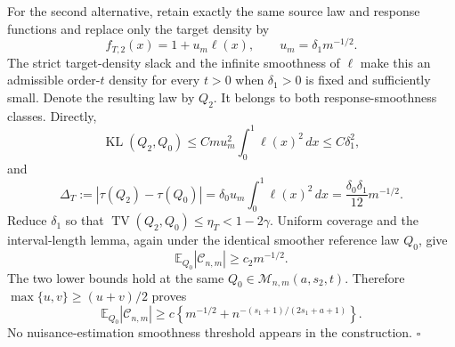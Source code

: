 For the second alternative, retain exactly the same source law and response functions and replace only the target density by
\[
f_{T,2}(x)=1+u_m\ell(x),
\qquad
u_m=\delta_1m^{-1/2}.
\]
The strict target-density slack and the infinite smoothness of \(\ell\) make this an admissible order-\(t\) density for every \(t>0\) when \(\delta_1>0\) is fixed and sufficiently small. Denote the resulting law by \(Q_2\). It belongs to both response-smoothness classes. Directly,
\[
\operatorname{KL}(Q_2,Q_0)
\le Cm u_m^2\int_0^1\ell(x)^2\,dx
\le C\delta_1^2,
\]
and
\[
\Delta_T:=|\tau(Q_2)-\tau(Q_0)|
=\delta_0u_m\int_0^1\ell(x)^2\,dx
=\frac{\delta_0\delta_1}{12}m^{-1/2}.
\]
Reduce \(\delta_1\) so that \(\operatorname{TV}(Q_2,Q_0)\le\eta_T<1-2\gamma\). Uniform coverage and the interval-length lemma, again under the identical smoother reference law \(Q_0\), give
\[
\mathbb E_{Q_0}|\mathcal C_{n,m}|
\ge c_2m^{-1/2}.
\]
The two lower bounds hold at the same \(Q_0\in\mathcal M_{n,m}(a,s_2,t)\). Therefore \(\max\{u,v\}\ge(u+v)/2\) proves
\[
\mathbb E_{Q_0}|\mathcal C_{n,m}|
\ge c\left\{m^{-1/2}+n^{-(s_1+1)/(2s_1+a+1)}\right\}.
\]
No nuisance-estimation smoothness threshold appears in the construction. \(\square\)